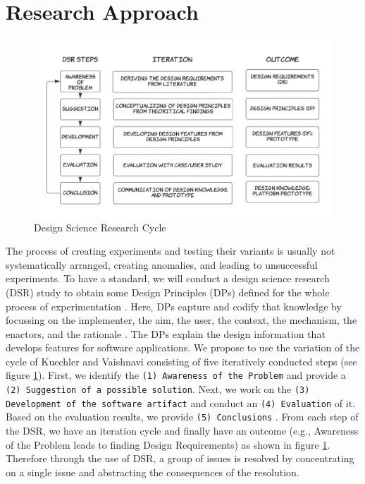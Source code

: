\section{Research Approach} 
\label{intro:section:research}
\begin{figure}[ht]
    \centering
    \includegraphics[scale=0.2]{images/solution-ideas/DSRcycle.png}
    \caption{Design Science Research Cycle \cite{paper:designprinciple:vk}}
    \label{intro:fig:dps}
\end{figure}

The process of creating experiments and testing their variants is usually not systematically arranged, creating anomalies, and leading to unsuccessful experiments.
To have a standard, we will conduct a design science research (DSR) study to obtain some Design Principles (DPs) defined for the whole process of experimentation \cite{paper:designprinciple:vk}. 
Here, DPs capture and codify that knowledge by focussing on the implementer, the aim, the user, the context, the mechanism, the enactors, and the rationale \cite{paper:designprinciple:gregor}. 
The DPs explain the design information that develops features for software applications.
We propose to use the variation of the cycle of Kuechler and Vaishnavi \cite{paper:designprinciple:vk} consisting of five iteratively conducted steps (see figure \ref{intro:fig:dps}). 
First, we identify the 
\texttt{(1) Awareness of the Problem} and provide a
\texttt{(2) Suggestion of a possible solution}. Next, we work on the 
\texttt{(3) Development of the software artifact} and conduct an 
\texttt{(4) Evaluation} of it. Based on the evaluation results, we provide 
\texttt{(5) Conclusions} \cite{misc:crowdsourcing:sg}.
From each step of the DSR, we have an iteration cycle and finally have an outcome (e.g., Awareness of the Problem leads to finding Design Requirements) as shown in figure \ref{intro:fig:dps}.
Therefore through the use of DSR, a group of issues is resolved by concentrating on a single issue and abstracting the consequences of the resolution.


